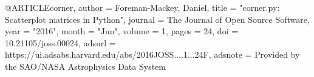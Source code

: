
@ARTICLE{corner,
       author = {{Foreman-Mackey}, Daniel},
        title = "{corner.py: Scatterplot matrices in Python}",
      journal = {The Journal of Open Source Software},
         year = "2016",
        month = "Jun",
       volume = {1},
        pages = {24},
          doi = {10.21105/joss.00024},
       adsurl = {https://ui.adsabs.harvard.edu/abs/2016JOSS....1...24F},
      adsnote = {Provided by the SAO/NASA Astrophysics Data System}
}
